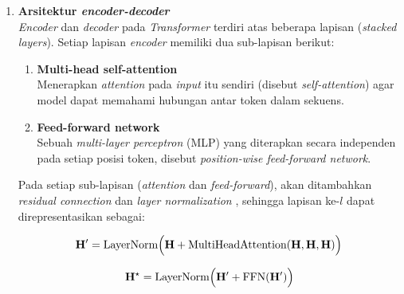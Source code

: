 \begin{enumerate}
\textbf{Multi-head attention} adalah ekstensi \textit{attention} dengan menggunakan beberapa set (\(Q, K, V\)) secara paralel. Setiap \textit{head} dapat belajar jenis relasi yang berbeda di waktu yang sama  dan hasilnya akan digabungkan (\textit{concatenate}) sebelum diproyeksikan kembali.

\item \textbf{Arsitektur \textit{encoder-decoder}} \\
\textit{Encoder} dan \textit{decoder} pada \textit{Transformer} terdiri atas beberapa lapisan (\textit{stacked layers}). Setiap lapisan \textit{encoder} memiliki dua sub-lapisan berikut:

\begin{enumerate}
    \item \textbf{Multi-head self-attention} \\
    Menerapkan \textit{attention} pada \textit{input} itu sendiri (disebut \textit{self-attention}) agar model dapat memahami hubungan antar token dalam sekuens.
    \item \textbf{Feed-forward network} \\
    Sebuah \textit{multi-layer perceptron} (MLP) yang diterapkan secara independen pada setiap posisi token, disebut \textit{position-wise feed-forward network}.
\end{enumerate}

Pada setiap sub-lapisan (\textit{attention} dan \textit{feed-forward}), akan ditambahkan \textit{residual connection} \parencite{He2016resnet} dan \textit{layer normalization} \parencite{Ba2016layernorm}, sehingga lapisan ke-\(l\) dapat direpresentasikan sebagai:

\begin{equationfloat}
\begin{equation}
\mathbf{H}' = \text{LayerNorm}\Bigl(\mathbf{H} + \text{MultiHeadAttention}(\mathbf{H},\mathbf{H},\mathbf{H})\Bigr)
\end{equation}
\caption{\textit{Residual connection} \& \textit{multi-head self-attention}}
\label{eq:transformer-encoder-1}
\end{equationfloat}


\begin{equationfloat}
\begin{equation}
\mathbf{H}^{\star} = \text{LayerNorm}\Bigl(\mathbf{H}' + \text{FFN}(\mathbf{H}')\Bigr)
\end{equation}
\caption{\textit{Residual connection} \& \textit{feed-forward network}}
\label{eq:transformer-encoder-2}
\end{equationfloat}


\end{enumerate}
